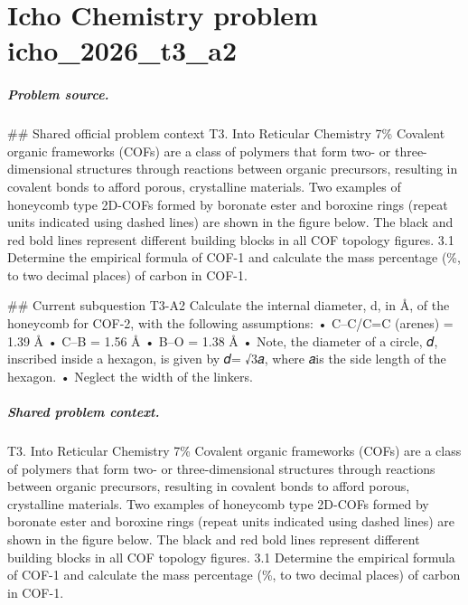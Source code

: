 
\chapter{Icho Chemistry problem icho\_2026\_t3\_a2}
\label{ch:IChO2026Problems_problem_icho_2026_t3_a2}

\paragraph{Problem source.}
\#\# Shared official problem context
T3. Into Reticular Chemistry 7\% Covalent organic frameworks (COFs) are a class of polymers that form two- or three-dimensional structures through reactions between organic precursors, resulting in covalent bonds to afford porous, crystalline materials. Two examples of honeycomb type 2D-COFs formed by boronate ester and boroxine rings (repeat units indicated using dashed lines) are shown in the figure below. The black and red bold lines represent different building blocks in all COF topology figures. 3.1 Determine the empirical formula of COF-1 and calculate the mass percentage (\%, to two decimal places) of carbon in COF-1.

\#\# Current subquestion T3-A2
Calculate the internal diameter, d, in Å, of the honeycomb for COF-2, with the following assumptions: • C–C/C=C (arenes) = 1.39 Å • C–B = 1.56 Å • B–O = 1.38 Å • Note, the diameter of a circle, 𝑑, inscribed inside a hexagon, is given by 𝑑= √3𝑎, where 𝑎is the side length of the hexagon. • Neglect the width of the linkers.

\paragraph{Shared problem context.}
T3. Into Reticular Chemistry 7\% Covalent organic frameworks (COFs) are a class of polymers that form two- or three-dimensional structures through reactions between organic precursors, resulting in covalent bonds to afford porous, crystalline materials. Two examples of honeycomb type 2D-COFs formed by boronate ester and boroxine rings (repeat units indicated using dashed lines) are shown in the figure below. The black and red bold lines represent different building blocks in all COF topology figures. 3.1 Determine the empirical formula of COF-1 and calculate the mass percentage (\%, to two decimal places) of carbon in COF-1.

